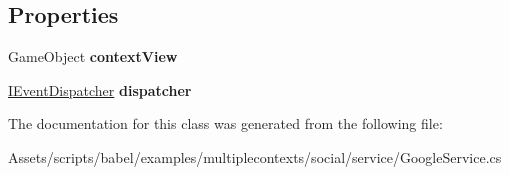 \subsection*{Properties}
\begin{DoxyCompactItemize}
\item 
\hypertarget{classbabel_1_1examples_1_1multiplecontexts_1_1social_1_1_google_service_a1d9ea1a31f0f341d2c85d2ffea2ef5ef}{Game\-Object {\bfseries context\-View}}\label{classbabel_1_1examples_1_1multiplecontexts_1_1social_1_1_google_service_a1d9ea1a31f0f341d2c85d2ffea2ef5ef}

\item 
\hypertarget{classbabel_1_1examples_1_1multiplecontexts_1_1social_1_1_google_service_ac69466caf61dcc62fe8c41996a704a1a}{\hyperlink{interfacebabel_1_1extensions_1_1dispatcher_1_1eventdispatcher_1_1api_1_1_i_event_dispatcher}{I\-Event\-Dispatcher} {\bfseries dispatcher}}\label{classbabel_1_1examples_1_1multiplecontexts_1_1social_1_1_google_service_ac69466caf61dcc62fe8c41996a704a1a}

\end{DoxyCompactItemize}


The documentation for this class was generated from the following file\-:\begin{DoxyCompactItemize}
\item 
Assets/scripts/babel/examples/multiplecontexts/social/service/Google\-Service.\-cs\end{DoxyCompactItemize}
